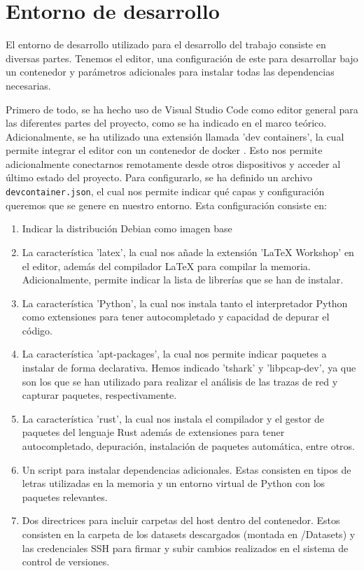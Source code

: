 \section{Entorno de desarrollo}

El entorno de desarrollo utilizado para el desarrollo del trabajo consiste en diversas partes. Tenemos el editor, una configuración de este para desarrollar bajo un contenedor y parámetros adicionales para instalar todas las dependencias necesarias.

Primero de todo, se ha hecho uso de Visual Studio Code como editor general para las diferentes partes del proyecto, como se ha indicado en el marco teórico. Adicionalmente, se ha utilizado una extensión llamada 'dev containers', la cual permite integrar el editor con un contenedor de docker \cite{devcontainers}. Esto nos permite adicionalmente conectarnos remotamente desde otros dispositivos y acceder al último estado del proyecto. Para configurarlo, se ha definido un archivo \texttt{devcontainer.json}, el cual nos permite indicar qué capas y configuración queremos que se genere en nuestro entorno. Esta configuración consiste en:

\begin{enumerate}
    \item Indicar la distribución Debian como imagen base
    \item La característica 'latex', la cual nos añade la extensión 'LaTeX Workshop' en el editor, además del compilador LaTeX para compilar la memoria. Adicionalmente, permite indicar la lista de librerías que se han de instalar.
    \item La característica 'Python', la cual nos instala tanto el interpretador Python como extensiones para tener autocompletado y capacidad de depurar el código.
    \item La característica 'apt-packages', la cual nos permite indicar paquetes a instalar de forma declarativa. Hemos indicado 'tshark' y 'libpcap-dev', ya que son los que se han utilizado para realizar el análisis de las trazas de red y capturar paquetes, respectivamente.
    \item La característica 'rust', la cual nos instala el compilador y el gestor de paquetes del lenguaje Rust además de extensiones para tener autocompletado, depuración, instalación de paquetes automática, entre otros.
    \item Un script para instalar dependencias adicionales. Estas consisten en tipos de letras utilizadas en la memoria y un entorno virtual de Python con los paquetes relevantes. 
    \item Dos directrices para incluir carpetas del host dentro del contenedor. Estos consisten en la carpeta de los datasets descargados (montada en /Datasets) y las credenciales SSH para firmar y subir cambios realizados en el sistema de control de versiones.
\end{enumerate}

